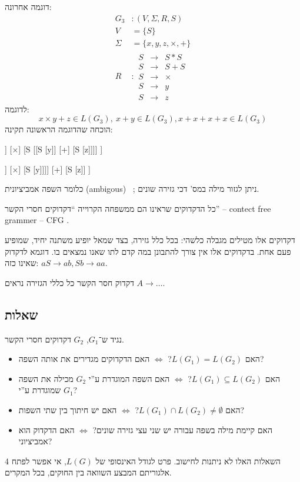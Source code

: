 \documentclass[]{article}
\newcommand\del   {$ \!\! $}
\newcommand\Si    {\Sigma}
\begin{document}
	דוגמה אחרונה: 
	\begin{align*}
		G_3 &\colon (V, \Si, R, S) \\
		V &=\{S\} \\
		\Si &= \{x, y, z, \times, +\} \\
		R &\colon \begin{matrix}
			S &\to &S * S \\
			S &\to &S + S \\
			S &\to & \times \\
			S &\to & y \\
			S &\to & z
		\end{matrix}
	\end{align*}
	לדוגמה: 
	\[ x \times y + z \in L(G_3), \ x+ y \in L(G_3), x+ x + x + x \in L(G_3) \]
	הוכחה שהדוגמה הראשונה תקינה: 
	
	\hfil
	\begin{forest}
		[S 
			[S  [x]]
			[$\times$]
			[S [[S [y]] [+] [S [z]]]]
		]
	\end{forest}
	\hfil
	\begin{forest}
		[S 
			[S  [[S [x]] [$\times$] [S [y]]]]
			[+]
			[S [z]]
		]
	\end{forest}
	\hfil
	
	כלומר השפה אמביציונית (ambigous) \ \del \del; ניתן לגזור מילה במס' דכי גזירה שונים. 
	
	כל הדקדוקים שראינו הם ממשפחה הקרוייה ``דקדוקים חסרי הקשר'' – contect free grammer – CFG \del. 
	
	דקדוקים אלו מטילים מגבלה כלשהי: בכל כלל גזירה, בצד שמאל יופיע משתנה יחיד, שמופיע פעם אחת. בדקדוקים אלו אין צורך להתבונן במה קדם לתו שאנו נמצאים בו. דוגמא לדקדוק שאינו כזה: $aS \to ab, Sb \to aa$. 
	
	דקדוק חסר הקשר כל כללי הגזירה נראים $A \to \dots$. 
	\subsection{שאלות}
	נגיד ש־$G_1 $, $G_2 $ דקדוקים חסרי הקשר. 
	\begin{itemize}[-]
		\item האם $L(G_1) = L(G_2)$? $\iff$ האם הדקדוקים מגדירים את אותה השפה?
		\item האם $L(G_1) \subseteq L(G_2)$? $\iff$ האם השפה המוגדרת ע''י $G_2$ מכילה את השפה שמוגדרת ע''י $G_1$?
		\item האם $L(G_1) \cap L(G_2) \neq \emptyset$? $\iff$ האם יש חיתוך בין שתי השפות?
		\item האם קיימת מילה בשפה עבורה יש שני עצי גזירה שונים? $\iff$ האם הדקדוק הוא אמביציוני?
	\end{itemize}
	4 השאלות האלו לא ניתנות לחישוב. פרט לגודל האינסופי של $L(G)$, אי אפשר לפתח אלגוריתם המבצע השוואה בין החוקים, בכל המקרים. 
	
\end{document}
